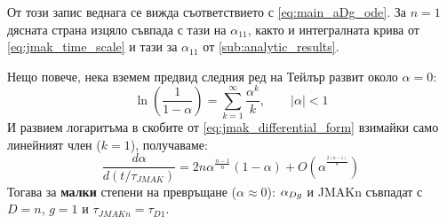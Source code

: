 От този запис веднага се вижда съответствието с \autoref{eq:main_aDg_ode}. За $n = 1$ дясната страна изцяло съвпада с тази на $\alpha_{11}$, както и интегралната крива от \autoref{eq:jmak_time_scale} и тази за $\alpha_{11}$ от \autoref{sub:analytic_results}.

\noindent Нещо повече, нека вземем предвид следния ред на Тейлър развит около $\alpha = 0$:
\begin{equation}
    \ln{\left( \frac{1}{1-\alpha} \right)} = \sum_{k=1}^\infty \frac{\alpha^k}{k}, \qquad |\alpha| < 1
\end{equation}
И развием логаритъма в скобите от \autoref{eq:jmak_differential_form} взимайки само линейният член ($k=1$), получаваме:
\begin{equation}
    \label{eq:jmakn_power_series}
    \frac{d \alpha}{d \left( t/\tau_{JMAK} \right)} = 2 n \alpha^{\frac{n-1}{n}}\left(1-\alpha\right) + O(\alpha^{^{\frac{2(n-1)}{n}}})
\end{equation} %
Тогава за \textbf{малки} степени на превръщане ($\alpha \approx 0$): $\alpha_{Dg}$ и JMAKn съвпадат с $D = n$, $g = 1$ и $\tau_{JMAKn} = \tau_{D1}$.

